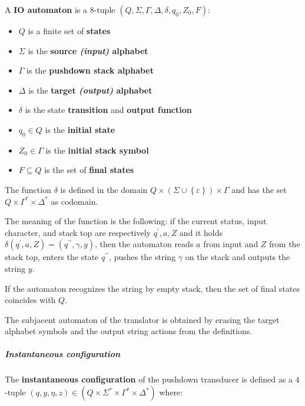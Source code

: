 \documentclass[english]{article}
\begin{document}
\begin{definition}[IO automaton]
  \label{def:pushdown-transducer}
  A \textbf{IO automaton} is  a \(8\)-tuple \(\left( Q, \Sigma, \Gamma, \Delta, \delta, q_0, Z_0, F \right)\):

  \begin{itemize}
    \item \(Q\) is a finite set of \textbf{states}
    \item \(\Sigma\) is the \textbf{source \textit{(input)} alphabet}
    \item \(\Gamma\) is the \textbf{pushdown stack alphabet}
    \item \(\Delta\) is the\textbf{ target \textit{(output)} alphabet}
    \item \(\delta\) is the state \textbf{transition} and \textbf{output function}
    \item \(q_0 \in Q\) is the \textbf{initial state}
    \item \(Z_0 \in \Gamma\) is the \textbf{initial stack symbol}
    \item \(F \subseteq Q\) is the set of \textbf{final states}
  \end{itemize}
\end{definition}

The function \(\delta\) is defined in the domain \(Q \times \left( \Sigma \cup \left\{ \varepsilon \right\} \right) \times \Gamma\) and has the set \(Q \times \Gamma^\ast \times \Delta^\ast\) as codomain.

The meaning of the function is the following: if the current status, input character, and stack top are respectively \(q^\prime, a, Z\) and it holds \(\delta\left(q^\prime, a, Z\right) = \left( q^{\prime\prime}, \gamma, y \right)\), then the automaton reads \(a\) from input and \(Z\) from the stack top, enters the state \(q^{\prime\prime}\), pushes the string \(\gamma\) on the stack and outputs the string \(y\).

If the automaton recognizes the string by empty stack, then the set of final states coincides with \(Q\).

The subjacent automaton of the translator is obtained by erasing the target alphabet symbols and the output string actions from the definitions.

\subparagraph*{Instantaneous configuration}
The \textbf{instantaneous configuration} of the pushdown transducer is defined as a \(4\)-tuple \(\left( q, y, \eta, z \right) \in \left( Q \times \Sigma^\ast \times \Gamma^\ast \times \Delta^\ast \right)\) where:
\end{document}
